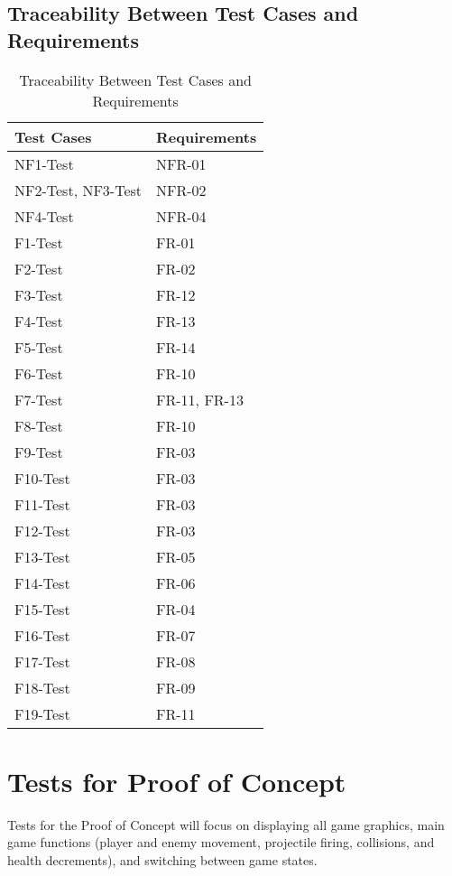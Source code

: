 \documentclass[12pt, titlepage]{article}
\begin{document}
\subsection{Traceability Between Test Cases and Requirements}
    \FloatBarrier
        \begin{table}[!htbp]
        \begin{tabular}{ll}
        \toprule
        Test Cases & Requirements \\
        \midrule
        NF1-Test & NFR-01 \\
        NF2-Test, NF3-Test & NFR-02 \\
        NF4-Test & NFR-04 \\
        F1-Test & FR-01 \\
        F2-Test & FR-02 \\
        F3-Test & FR-12 \\
        F4-Test & FR-13 \\
        F5-Test & FR-14 \\
        F6-Test & FR-10 \\
        F7-Test & FR-11, FR-13 \\
        F8-Test & FR-10 \\
        F9-Test & FR-03 \\
        F10-Test & FR-03 \\
        F11-Test & FR-03 \\
        F12-Test & FR-03 \\
        F13-Test & FR-05 \\
        F14-Test & FR-06 \\
        F15-Test & FR-04 \\
        F16-Test & FR-07 \\
        F17-Test & FR-08 \\
        F18-Test & FR-09 \\
        F19-Test & FR-11 \\
        \bottomrule
        \end{tabular}
        \caption{Traceability Between Test Cases and Requirements}
        \end{table}
\FloatBarrier

\section{Tests for Proof of Concept}

Tests for the Proof of Concept will focus on displaying all game graphics, main game functions (player and enemy movement, projectile firing, collisions, and health decrements), and switching between game states.  
\end{document}
